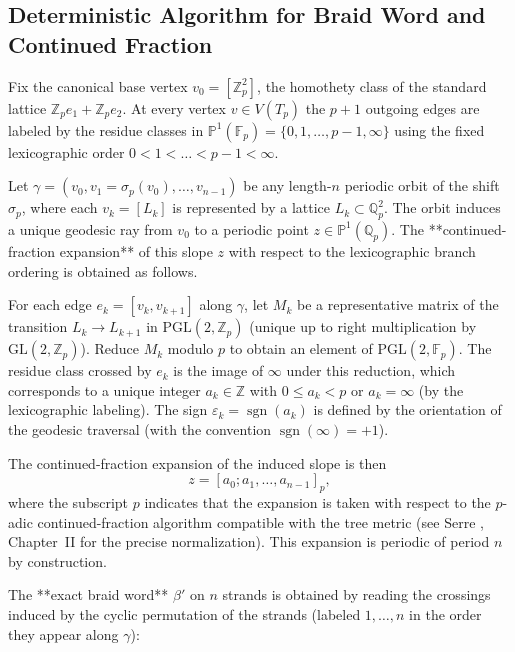\subsection{Deterministic Algorithm for Braid Word and Continued Fraction}
\label{subsec:deterministic-algorithm}

Fix the canonical base vertex \(v_0 = [\mathbb{Z}_p^2]\), the homothety class of the standard lattice \(\mathbb{Z}_p e_1 + \mathbb{Z}_p e_2\). At every vertex \(v \in V(T_p)\) the \(p+1\) outgoing edges are labeled by the residue classes in \(\mathbb{P}^1(\mathbb{F}_p) = \{0,1,\dots,p-1,\infty\}\) using the fixed lexicographic order \(0 < 1 < \dots < p-1 < \infty\).

Let \(\gamma = (v_0, v_1 = \sigma_p(v_0), \dots, v_{n-1})\) be any length-\(n\) periodic orbit of the shift \(\sigma_p\), where each \(v_k = [L_k]\) is represented by a lattice \(L_k \subset \mathbb{Q}_p^2\). The orbit induces a unique geodesic ray from \(v_0\) to a periodic point \(z \in \mathbb{P}^1(\mathbb{Q}_p)\). The **continued-fraction expansion** of this slope \(z\) with respect to the lexicographic branch ordering is obtained as follows.

For each edge \(e_k = [v_k, v_{k+1}]\) along \(\gamma\), let \(M_k\) be a representative matrix of the transition \(L_k \to L_{k+1}\) in \(\mathrm{PGL}(2,\mathbb{Z}_p)\) (unique up to right multiplication by \(\mathrm{GL}(2,\mathbb{Z}_p)\)). Reduce \(M_k\) modulo \(p\) to obtain an element of \(\mathrm{PGL}(2,\mathbb{F}_p)\). The residue class crossed by \(e_k\) is the image of \(\infty\) under this reduction, which corresponds to a unique integer \(a_k \in \mathbb{Z}\) with \(0 \leq a_k < p\) or \(a_k = \infty\) (by the lexicographic labeling). The sign \(\varepsilon_k = \operatorname{sgn}(a_k)\) is defined by the orientation of the geodesic traversal (with the convention \(\operatorname{sgn}(\infty) = +1\)).

The continued-fraction expansion of the induced slope is then
\[
z = [a_0; a_1, \dots, a_{n-1}]_p,
\]
where the subscript \(p\) indicates that the expansion is taken with respect to the \(p\)-adic continued-fraction algorithm compatible with the tree metric (see Serre \cite{Serre80}, Chapter~II for the precise normalization). This expansion is periodic of period \(n\) by construction.

The **exact braid word** \(\beta'\) on \(n\) strands is obtained by reading the crossings induced by the cyclic permutation of the strands (labeled \(1,\dots,n\) in the order they appear along \(\gamma\)):

